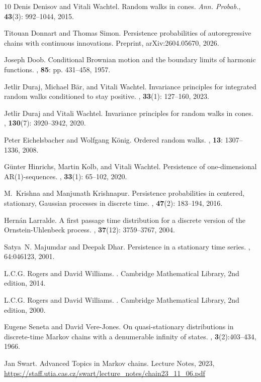 \documentclass[12pt]{article}
\newcommand{\1}{\mathds{1}}
\theoremstyle{definition}
\theoremstyle{plain}
\theoremstyle{remark}
\begin{document}
\begin{thebibliography}{10}
Denis Denisov and Vitali Wachtel.
\newblock Random walks in cones. {\em Ann. Probab.}, {\bf 43}(3): 992--1044, 2015.

 Titouan Donnart and Thomas Simon.
 \newblock Persistence probabilities of autoregressive chains with continuous innovations. 
 \newblock Preprint, arXiv:2604.05670, 2026.

Joseph Doob.
\newblock Conditional {B}rownian motion and the boundary limits of harmonic functions. 
, {\bf 85}: pp. 431--458, 1957.

Jetlir Duraj, Michael B\"ar, and Vitali Wachtel.
\newblock Invariance principles for integrated random walks conditioned to stay positive. 
, {\bf 33}(1): 127--160, 2023.

Jetlir Duraj and Vitali Wachtel.
\newblock Invariance principles for random walks in cones. 
, {\bf 130}(7): 3920--3942, 2020.

Peter Eichelsbacher and Wolfgang K\"onig.
\newblock Ordered random walks. 
, {\bf 13}: 1307--1336, 2008.

G{\"u}nter Hinrichs, Martin Kolb, and Vitali Wachtel.
\newblock Persistence of one-dimensional {AR}(1)-sequences.
, {\bf 33}(1): 65--102, 2020.

M.~Krishna and Manjunath Krishnapur.
\newblock Persistence probabilities in centered, stationary, {Gaussian}
  processes in discrete time.
, {\bf 47}(2): 183--194, 2016.

Hern\'an Larralde.
\newblock A first passage time distribution for a discrete version of the
  {O}rnstein-{U}hlenbeck process.
, {\bf 37}(12): 3759--3767, 2004.

Satya~N. Majumdar and Deepak Dhar.
\newblock Persistence in a stationary time series.
, 64:046123, 2001.


L.C.G. Rogers and David Williams. 
. Cambridge Mathematical Library, 2nd edition, 2014.

L.C.G. Rogers and David Williams. 
. Cambridge Mathematical Library, 2nd edition, 2000.

Eugene Seneta and David Vere-Jones.
\newblock On quasi-stationary distributions in discrete-time {M}arkov chains with a denumerable infinity of states.
, {\bf 3}(2):403--434, 1966.


Jan Swart.
\newblock Advanced Topics in Markov chains. Lecture Notes, 2023,
 \url{https://staff.utia.cas.cz/swart/lecture\_notes/chain23\_11\_06.pdf}

\end{thebibliography}
\end{document}
